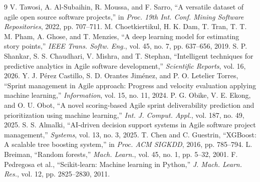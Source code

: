 \documentclass[conference]{IEEEtran}
\begin{document}
\begin{thebibliography}{9}
 V. Tawosi, A. Al-Subaihin, R. Moussa, and F. Sarro, ``A versatile dataset of agile open source software projects,'' in \emph{Proc. 19th Int. Conf. Mining Software Repositories}, 2022, pp. 707--711.
 M. Choetkiertikul, H. K. Dam, T. Tran, T. T. M. Pham, A. Ghose, and T. Menzies, ``A deep learning model for estimating story points,'' \emph{IEEE Trans. Softw. Eng.}, vol. 45, no. 7, pp. 637--656, 2019.
 S. P. Shankar, S. S. Chaudhari, V. Mishra, and T. Stephan, ``Intelligent techniques for predictive analytics in Agile software development,'' \emph{Scientific Reports}, vol. 16, 2026.
 Y. J. P\'erez Castillo, S. D. Orantes Jim\'enez, and P. O. Letelier Torres, ``Sprint management in Agile approach: Progress and velocity evaluation applying machine learning,'' \emph{Information}, vol. 15, no. 11, 2024.
 P. G. Obike, V. E. Ekong, and O. U. Obot, ``A novel scoring-based Agile sprint deliverability prediction and prioritization using machine learning,'' \emph{Int. J. Comput. Appl.}, vol. 187, no. 49, 2025.
 S. S. Almalki, ``AI-driven decision support systems in Agile software project management,'' \emph{Systems}, vol. 13, no. 3, 2025.
 T. Chen and C. Guestrin, ``XGBoost: A scalable tree boosting system,'' in \emph{Proc. ACM SIGKDD}, 2016, pp. 785--794.
 L. Breiman, ``Random forests,'' \emph{Mach. Learn.}, vol. 45, no. 1, pp. 5--32, 2001.
 F. Pedregosa et al., ``Scikit-learn: Machine learning in Python,'' \emph{J. Mach. Learn. Res.}, vol. 12, pp. 2825--2830, 2011.
\end{thebibliography}
\end{document}
